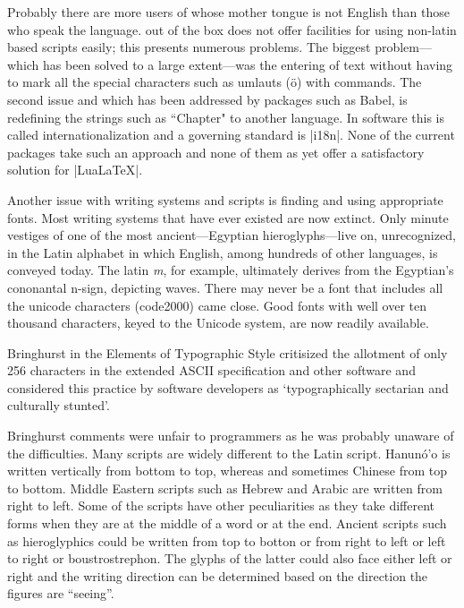  
Probably there are more users of \latexe whose mother tongue is not English than those who speak the language. \tex out of the box does not offer facilities for using non-latin based scripts easily; this presents numerous problems. The biggest problem---which has been solved to a large extent---was the entering of text without having to mark all the special
characters such as umlauts (\"o) with commands. The second issue and which has been addressed by packages such as Babel, is redefining the strings such as ``Chapter" to another language. In software this is called internationalization and a governing standard is |i18n|. None of the current packages take such an approach and none of them as yet offer a satisfactory solution for |LuaLaTeX|. 



Another issue with writing systems and scripts is finding and using appropriate fonts. Most writing systems that have ever existed are now extinct. Only minute vestiges of one of the most ancient---Egyptian hieroglyphs---live on, unrecognized, in the Latin alphabet in which English, among hundreds of other languages, is conveyed today. The latin \textit{m}, for example, ultimately derives from the Egyptian's cononantal n-sign, depicting waves. There may never be a font that includes all the unicode characters (code2000) came close. Good fonts with well over ten thousand characters, keyed to the Unicode system, are now readily available. 

Bringhurst in the Elements of Typographic Style \citeyearpar{Bringhurst2005} critisized the allotment of only 256 characters in the extended ASCII specification and other software and considered this practice by software developers as `typographically sectarian and culturally stunted’. 


Bringhurst comments were unfair to programmers as he was probably unaware of the difficulties. Many  scripts are widely different to the Latin script. Hanunó'o is written vertically from bottom to top, whereas  and sometimes Chinese from top to bottom.  Middle Eastern scripts such as Hebrew and Arabic are written from right to left. Some of the scripts have other peculiarities as they take different forms when they are at the middle of a word or at the end. Ancient scripts such as hieroglyphics could be written from top to botton or from right to left or left to right or boustrostrephon. The glyphs of the latter could also face either left or right and the writing direction can be determined based on the direction the figures are ``seeing''. 

